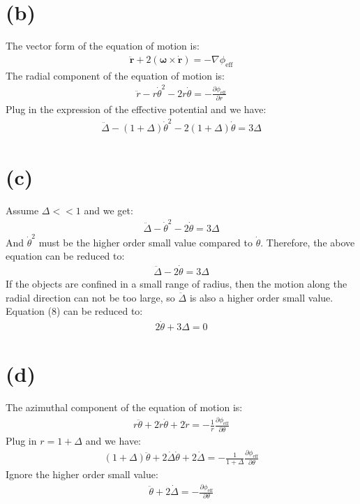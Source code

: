 \documentclass[a4paper,12pt]{article}
\begin{document}
\section*{(b)}
The vector form of the equation of motion is:
\begin{align*}
    \ddot{\boldsymbol{r}} + 2(\boldsymbol{\omega} \times \dot{\boldsymbol{r}}) = - \nabla \phi_{\text{eff}}
\end{align*}
The radial component of the equation of motion is:
\begin{align*}
    \ddot{r} - r\dot \theta^2 -2 r \dot{\theta}= - \frac{\partial \phi_{\text{eff}}}{\partial r}
\end{align*}
Plug in the expression of the effective potential and we have:
\begin{align*}
    \ddot{\Delta} - (1 + \Delta) \dot{\theta}^2 - 2(1 + \Delta)\dot{\theta} = 3\Delta
\end{align*}

\section*{(c)}
Assume $\Delta << 1$ and we get:
\begin{align*}
    \ddot{\Delta} - \dot{\theta}^2 - 2\dot{\theta} = 3\Delta
\end{align*}
And $\dot{\theta}^2$ must be the higher order small value compared to $\dot{\theta}$. 
Therefore, the above equation can be reduced to:
\begin{align*}
    \ddot{\Delta} - 2\dot{\theta} = 3\Delta
\end{align*}
If the objects are confined in a small range of radius, then the motion 
along the radial direction can not be too large, so $\ddot{\Delta}$ is also a 
higher order small value. Equation (8) can be reduced to:
\begin{align*}
    2\dot{\theta} + 3\Delta = 0
\end{align*}

\section*{(d)}
The azimuthal component of the equation of motion is:
\begin{align*}
    r\ddot{\theta} + 2\dot{r}\dot{\theta} +2 \dot{r}= - \frac{1}{r}\frac{\partial \phi_{\text{eff}}}{\partial \theta}
\end{align*}
Plug in $r = 1 + \Delta$ and we have:
\begin{align*}
    (1 + \Delta) \ddot{\theta} + 2 \dot{\Delta} \dot{\theta} + 2 \dot{\Delta} = -\frac{1}{1+\Delta} \frac{\partial \phi_{\text{eff}}}{\partial \theta}
\end{align*}
Ignore the higher order small value:
\begin{align*}
    \ddot{\theta} + 2 \dot{\Delta} = -\frac{\partial \phi_{\text{eff}}}{\partial \theta}
\end{align*}
\end{document}
